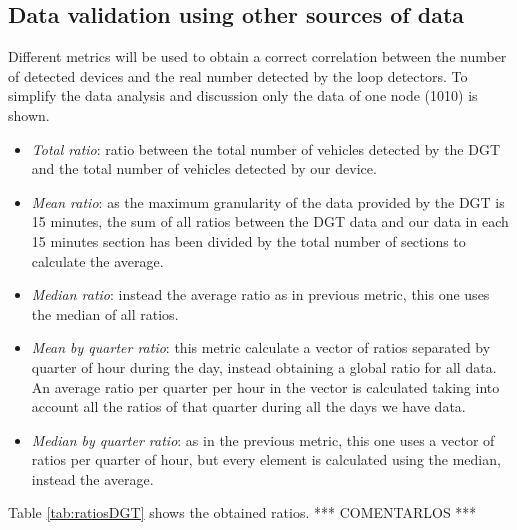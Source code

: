 \documentclass[preprint]{elsarticle}
\begin{document}
\subsection{Data validation using other sources of data}

Different metrics will be used to obtain a correct correlation between the number of detected devices and the real number detected by the loop detectors. To simplify the data analysis and discussion only the data of one node (1010) is shown.

\begin{itemize}
\item {\em Total ratio}: ratio between the total number of vehicles detected by the DGT and the total number of vehicles detected by our device.
\item {\em Mean ratio}: as the maximum granularity of the data provided by the DGT is 15 minutes, the sum of all ratios between the DGT data and our data in each 15 minutes section has been divided by the total number of sections to calculate the average.
\item {\em Median ratio}: instead the average ratio as in previous metric, this one uses the median of all ratios.
\item {\em Mean by quarter ratio}: this metric calculate a vector of ratios separated by quarter of hour during the day, instead obtaining a global ratio for all data. An average ratio per quarter per hour in the vector is calculated taking into account all the ratios of that quarter during all the days we have data.
\item {\em Median by quarter ratio}: as in the previous metric, this one uses a vector of ratios per quarter of hour, but every element is calculated using the median, instead the average.
\end{itemize}


Table \ref{tab:ratiosDGT} shows the obtained ratios. *** COMENTARLOS ***

\begin{table}[htb]
\centering
{}
\caption{Different ratios between the DGT data and the data gathered by MOBIWIT in node 1010.}
\label{tab:ratiosDGT}
\end{table}
\end{document}
